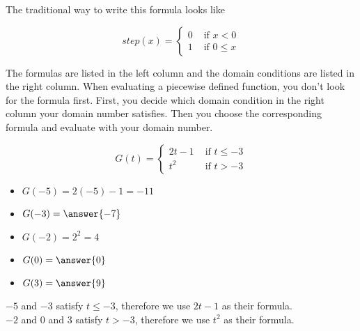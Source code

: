 \documentclass{ximera}
\begin{document}
The traditional way to write this formula looks like

\[
step(x) = 
\begin{cases}
  0 & \text{ if } x < 0 \\
  1 & \text{ if } 0 \leq x
\end{cases}
\]

The formulas are listed in the left column and the domain conditions are listed in the right column.  When evaluating a piecewise defined function, you don't look for the formula first.  First, you decide which domain condition in the right column your domain number satisfies.  Then you choose the corresponding formula and evaluate with your domain number.











\begin{example}

\[
G(t) = 
\begin{cases}
  2t-1 & \text{ if } t \leq -3 \\
  t^2 & \text{ if } t > -3
\end{cases}
\]


\begin{itemize}
\item $G(-5) = 2(-5) - 1 = -11$  
\item $G(-3) = \answer{-7}$ 
\item $G(-2) = 2^2 = 4$ 
\item $G(0) = \answer{0}$ 
\item $G(3) = \answer{9}$ 
\end{itemize}


$-5$ and $-3$ satisfy $t \leq -3$, therefore we use $2t-1$ as their formula. \\
$-2$ and $0$ and $3$ satisfy $t > -3$, therefore we use $t^2$ as their formula. \\

\end{example}
\end{document}
